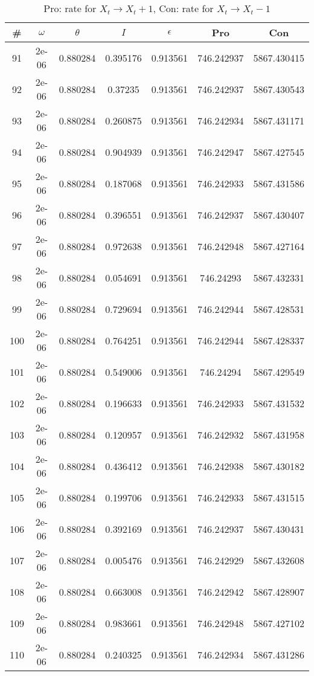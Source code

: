 \newpage
\begin{table}
\caption{Pro: rate for $X_t \rightarrow X_t + 1$, Con: rate for $X_t \rightarrow X_t - 1$}
\begin{tabular*}{\linewidth}{c|c|c|c|c|c|c}
\# & $\omega$ & $\theta$ & $I$ & $\epsilon$ & Pro & Con \\
\hline
91 & 2e-06 & 0.880284 & 0.395176 & 0.913561 & 746.242937 & 5867.430415\\
92 & 2e-06 & 0.880284 & 0.37235 & 0.913561 & 746.242937 & 5867.430543\\
93 & 2e-06 & 0.880284 & 0.260875 & 0.913561 & 746.242934 & 5867.431171\\
94 & 2e-06 & 0.880284 & 0.904939 & 0.913561 & 746.242947 & 5867.427545\\
95 & 2e-06 & 0.880284 & 0.187068 & 0.913561 & 746.242933 & 5867.431586\\
96 & 2e-06 & 0.880284 & 0.396551 & 0.913561 & 746.242937 & 5867.430407\\
97 & 2e-06 & 0.880284 & 0.972638 & 0.913561 & 746.242948 & 5867.427164\\
98 & 2e-06 & 0.880284 & 0.054691 & 0.913561 & 746.24293 & 5867.432331\\
99 & 2e-06 & 0.880284 & 0.729694 & 0.913561 & 746.242944 & 5867.428531\\
100 & 2e-06 & 0.880284 & 0.764251 & 0.913561 & 746.242944 & 5867.428337\\
101 & 2e-06 & 0.880284 & 0.549006 & 0.913561 & 746.24294 & 5867.429549\\
102 & 2e-06 & 0.880284 & 0.196633 & 0.913561 & 746.242933 & 5867.431532\\
103 & 2e-06 & 0.880284 & 0.120957 & 0.913561 & 746.242932 & 5867.431958\\
104 & 2e-06 & 0.880284 & 0.436412 & 0.913561 & 746.242938 & 5867.430182\\
105 & 2e-06 & 0.880284 & 0.199706 & 0.913561 & 746.242933 & 5867.431515\\
106 & 2e-06 & 0.880284 & 0.392169 & 0.913561 & 746.242937 & 5867.430431\\
107 & 2e-06 & 0.880284 & 0.005476 & 0.913561 & 746.242929 & 5867.432608\\
108 & 2e-06 & 0.880284 & 0.663008 & 0.913561 & 746.242942 & 5867.428907\\
109 & 2e-06 & 0.880284 & 0.983661 & 0.913561 & 746.242948 & 5867.427102\\
110 & 2e-06 & 0.880284 & 0.240325 & 0.913561 & 746.242934 & 5867.431286\\

\end{tabular*}
\end{table}
